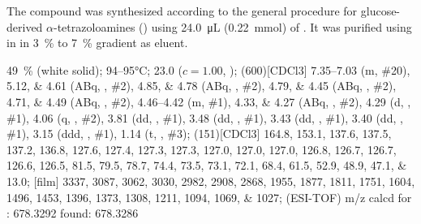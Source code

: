 The compound was synthesized according to the general procedure for glucose-derived $\alpha$-tetrazoloamines () using \SI{24.0}{\micro\liter} (\SI{0.22}{\milli\mol}) of .
It was purified using  in  in \SI{3}{\percent} to \SI{7}{\percent} gradient as eluent.
\begin{fullexp}
	 \SI{49}{\percent} (white solid); 
	 \numrange{94}{95}\si{\celsius}; 
	\data{[$\alpha^{23}_D$]~$=$} \num{23.0} ($c = 1.00$, ); 
	\NMR(600)[CDCl3] \numrange{7.35}{7.03} (m, \#{20}), \numlist{5.12;4.61} (ABq, , \#{2}), \numlist{4.85;4.78} (ABq, , \#{2}), \numlist{4.79;4.45} (ABq, , \#{2}), \numlist{4.71;4.49} (ABq, , \#{2}), \numrange{4.46}{4.42} (m, \#{1}), \numlist{4.33;4.27} (ABq, , \#{2}), \num{4.29} (d, , \#{1}), \num{4.06} (q, , \#{2}), \num{3.81} (dd, , \#{1}), \num{3.48} (dd, , \#{1}), \num{3.43} (dd, , \#{1}), \num{3.40} (dd, , \#{1}), \num{3.15} (ddd, , \#{1}), \num{1.14} (t, , \#{3}); 
	(151)[CDCl3] \numlist{164.8; 153.1; 137.6; 137.5; 137.2; 136.8; 127.6; 127.4; 127.3; 127.3; 127.0; 127.0; 127.0; 126.8; 126.7; 126.7; 126.6; 126.5; 81.5; 79.5; 78.7; 74.4; 73.5; 73.1; 72.1; 68.4; 61.5; 52.9; 48.9; 47.1; 13.0}; 
	[film] \numlist{3337; 3087; 3062; 3030; 2982; 2908; 2868; 1955; 1877; 1811; 1751; 1604; 1496; 1453; 1396; 1373; 1308; 1211; 1094; 1069; 1027}; 
	 (ESI-TOF) m/z calcd for : \num{678.3292} found: \num{678.3286}
\end{fullexp}

